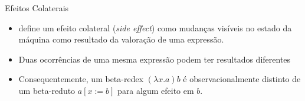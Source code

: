 \begin{frame}{Efeitos Colaterais}
    \begin{itemize}
        \item {} define um efeito colateral (\textit{side effect}) como mudanças visíveis no estado da máquina como resultado da valoração de uma expressão.

        \item Duas ocorrências de uma mesma expressão podem ter resultados diferentes

        \item Consequentemente, um beta-redex $(\lambda x.a) b$ é observacionalmente distinto de um beta-reduto $a[x:=b]$ para algum efeito em $b$.
    \end{itemize}
\end{frame}